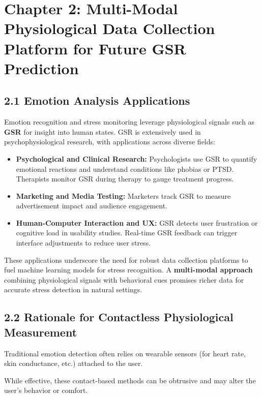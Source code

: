 \label{chap:2}
\chapter{Chapter 2: Multi-Modal Physiological Data Collection Platform for Future GSR Prediction}

\section{2.1 Emotion Analysis Applications}

Emotion recognition and stress monitoring leverage physiological signals such as \textbf{GSR} for insight into human states. GSR is extensively used in psychophysiological research, with applications across diverse fields:

\begin{itemize}
\item \textbf{Psychological and Clinical Research:} Psychologists use GSR to quantify emotional reactions and understand conditions like phobias or PTSD. Therapists monitor GSR during therapy to gauge treatment progress.

\item \textbf{Marketing and Media Testing:} Marketers track GSR to measure advertisement impact and audience engagement.

\item \textbf{Human-Computer Interaction and UX:} GSR detects user frustration or cognitive load in usability studies. Real-time GSR feedback can trigger interface adjustments to reduce user stress.
\end{itemize}

These applications underscore the need for robust data collection platforms to fuel machine learning models for stress recognition. A \textbf{multi-modal approach} combining physiological signals with behavioral cues promises richer data for accurate stress detection in natural settings.

\section{2.2 Rationale for Contactless Physiological Measurement}

Traditional emotion detection often relies on wearable sensors (for heart rate, skin conductance, etc.) attached to the user.

While effective, these contact-based methods can be obtrusive and may alter the user's behavior or comfort.


